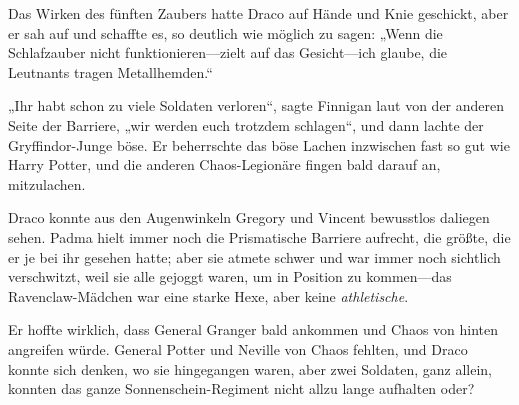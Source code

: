 Das Wirken des fünften Zaubers hatte Draco auf Hände und Knie geschickt, aber er sah auf und schaffte es, so deutlich wie möglich zu sagen: „Wenn die Schlafzauber nicht funktionieren—zielt auf das Gesicht—ich glaube, die Leutnants tragen Metallhemden.“

„Ihr habt schon zu viele Soldaten verloren“, sagte Finnigan laut von der anderen Seite der Barriere, „wir werden euch trotzdem schlagen“, und dann lachte der Gryffindor-Junge böse. Er beherrschte das böse Lachen inzwischen fast so gut wie Harry Potter, und die anderen Chaos-Legionäre fingen bald darauf an, mitzulachen.

Draco konnte aus den Augenwinkeln Gregory und Vincent bewusstlos daliegen sehen. Padma hielt immer noch die Prismatische Barriere aufrecht, die größte, die er je bei ihr gesehen hatte; aber sie atmete schwer und war immer noch sichtlich verschwitzt, weil sie alle gejoggt waren, um in Position zu kommen—das Ravenclaw-Mädchen war eine starke Hexe, aber keine \emph{athletische}.

Er hoffte wirklich, dass General Granger bald ankommen und Chaos von hinten angreifen würde. General Potter und Neville von Chaos fehlten, und Draco konnte sich denken, wo sie hingegangen waren, aber zwei Soldaten, ganz allein, konnten das ganze Sonnenschein-Regiment nicht allzu lange aufhalten oder?

\later

